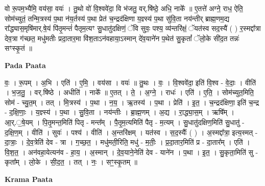 \documentclass[17pt]{extarticle}
\begin{document}
वो रू॒पम॒भ्यैमि॒ वय॑सा॒ वयः॑ । तु॒थो वो॑ वि॒श्ववे॑दा॒ वि भ॑जतु॒ वर्.षि॑ष्ठे॒ अधि॒ नाके᳚ ॥ ए॒तत्ते॑ अग्ने॒ राध॒ ऐति॒ सोम॑च्युतं॒ तन्मि॒त्रस्य॑ प॒था न॑य॒र्तस्य॑ प॒था प्रेत॑ च॒न्द्रद॑क्षिणा य॒ज्ञ्स्य॑ प॒था सु॑वि॒ता नय॑न्तीर् ब्राह्म॒णम॒द्य रा᳚द्ध्यास॒मृषि॑मार्.षे॒यं पि॑तृ॒मन्तं॑ पैतृम॒त्यꣳ सु॒धातु॑दक्षिणं॒ ॅवि सुवः॒ पश्य॒ व्य॑न्तरि॑क्षं॒ ॅयत॑स्व सद॒स्यै॑ ( ) र॒स्मद्दा᳚त्रा देव॒त्रा ग॑च्छत॒ मधु॑मतीः प्रदा॒तार॒मा वि॑श॒ताऽन॑वहाया॒ऽस्मान् दे॑व॒याने॑न प॒थेत॑ सु॒कृतां᳚ ॅलो॒के सी॑द॒त तन्नः॑ सꣳस्कृ॒तं ॥ \newline

\textbf{Pada Paata} \newline

वः॒ । रू॒पम् । अ॒भि । एति॑ । ए॒मि॒ । वय॑सा । वयः॑ ॥ तु॒थः । वः॒ । वि॒श्ववे॑दा॒ इति॑ वि॒श्व - वे॒दाः॒ । वीति॑ । भ॒ज॒तु॒ । वर्.षि॑ष्ठे । अधीति॑ । नाके᳚ ॥ ए॒तत् । ते॒ । अ॒ग्ने॒ । राधः॑ । एति॑ । ए॒ति॒ । सोम॑च्युत॒मिति॒ सोम॑ - च्यु॒त॒म् । तत् । मि॒त्रस्य॑ । प॒था । न॒य॒ । ऋ॒तस्य॑ । प॒था । प्रेति॑ । इ॒त॒ । च॒न्द्रद॑क्षिणा॒ इति॑ च॒न्द्र - द॒क्षि॒णाः॒ । य॒ज्ञ्स्य॑ । प॒था । सु॒वि॒ता । नय॑न्तीः । ब्रा॒ह्म॒णम् । अ॒द्य । रा॒द्ध्या॒स॒म् । ऋषि᳚म् । आ॒र्.॒षे॒यम् । पि॒तृ॒मन्त॒मिति॑ पितृ - मन्त᳚म् । पै॒तृ॒म॒त्यमिति॑ पैतृ - म॒त्यम् । सु॒धातु॑दक्षिण॒मिति॑ सु॒धातु॑ - द॒क्षि॒ण॒म् । वीति॑ । सुवः॑ । पश्य॑ । वीति॑ । अ॒न्तरि॑क्षम् । यत॑स्व । स॒द॒स्यैः᳚ ( ) । अ॒स्मद्दा᳚त्रा॒ इत्य॒स्मत् - दा॒त्राः॒ । दे॒व॒त्रेति॑ देव - त्रा । ग॒च्छ॒त॒ । मधु॑मती॒रिति॒ मधु॑ - म॒तीः॒ । प्र॒दा॒तार॒मिति॑ प्र - दा॒तार᳚म् । एति॑ । वि॒श॒त॒ । अन॑वहा॒येत्यन॑व - हा॒य॒ । अ॒स्मान् । दे॒व॒याने॒नेति॑ देव - याने॑न । प॒था । इ॒त॒ । सु॒कृता॒मिति॑ सु - कृता᳚म् । लो॒के । सी॒द॒त॒ । तत् । नः॒ । सꣳ॒॒स्कृ॒तम् ॥  \newline


\textbf{Krama Paata} \newline
\end{document}
